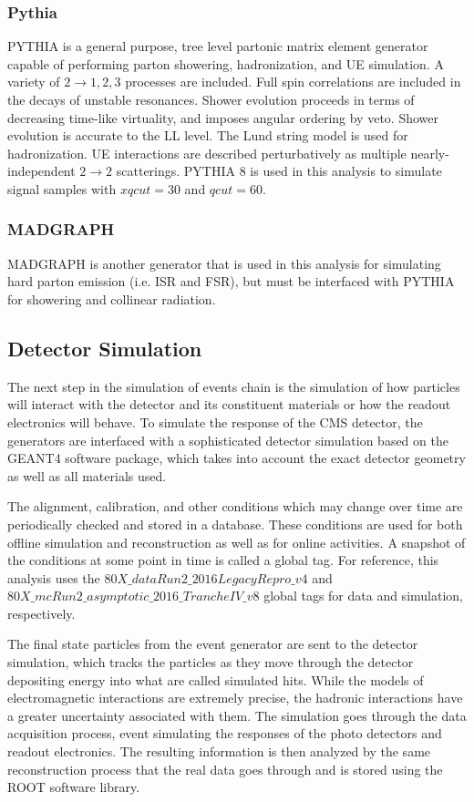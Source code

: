 \subsubsection{Pythia}

PYTHIA\cite{Sjostrand:2014zea} is a general purpose, tree level partonic matrix element generator capable of performing parton showering, hadronization, and UE simulation. A variety of $2\rightarrow1,2,3$ processes are included. Full spin correlations are included in the decays of unstable resonances. Shower evolution proceeds in terms of decreasing time-like virtuality, and imposes angular ordering by veto. Shower evolution is accurate to the LL level. The Lund string model is used for hadronization. UE interactions are described perturbatively as multiple nearly-independent $2\rightarrow 2$ scatterings. PYTHIA 8 is used in this analysis to simulate signal samples with $xqcut=30$ and $qcut=60$.

\subsubsection{MADGRAPH}

MADGRAPH\cite{Alwall:1647049} is another generator that is used in this analysis for simulating hard parton emission (i.e. ISR and FSR), but must be interfaced with PYTHIA for showering and collinear radiation.

\subsection{Detector Simulation}

The next step in the simulation of events chain is the simulation of how particles will interact with the detector and its constituent materials or how the readout electronics will behave. To simulate the response of the CMS detector, the generators are interfaced with a sophisticated detector simulation based on the GEANT4\cite{geant4sim} software package, which takes into account the exact detector geometry as well as all materials used.

The alignment, calibration, and other conditions which may change over time are periodically checked and stored in a database. These conditions are used for both offline simulation and reconstruction as well as for online activities. A snapshot of the conditions at some point in time is called a global tag. For reference, this analysis uses the $80X\_dataRun2\_2016LegacyRepro\_v4$ and $80X\_mcRun2\_asymptotic\_2016\_TrancheIV\_v8$ global tags for data and simulation, respectively. 

The final state particles from the event generator are sent to the detector simulation, which tracks the particles as they move through the detector depositing energy into what are called simulated hits. While the models of electromagnetic interactions are extremely precise, the hadronic interactions have a greater uncertainty associated with them. The simulation goes through the data acquisition process, event simulating the responses of the photo detectors and readout electronics. The resulting information is then analyzed by the same reconstruction process that the real data goes through and is stored using the ROOT software library. 

